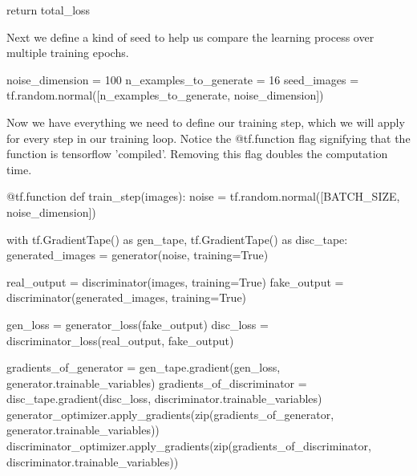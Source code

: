 \documentclass[%
oneside,                 %
final,                   %
10pt]{article}
\begin{document}
    return total_loss

\epycod


Next we define a kind of seed to help us compare the learning process over
multiple training epochs.





\bpycod
noise_dimension = 100
n_examples_to_generate = 16
seed_images = tf.random.normal([n_examples_to_generate, noise_dimension])

\epycod


Now we have everything we need to define our training step, which we will apply
for every step in our training loop. Notice the @tf.function flag signifying
that the function is tensorflow 'compiled'. Removing this flag doubles the
computation time.

























\bpycod
@tf.function
def train_step(images):
    noise = tf.random.normal([BATCH_SIZE, noise_dimension])

    with tf.GradientTape() as gen_tape, tf.GradientTape() as disc_tape:
        generated_images = generator(noise, training=True)

        real_output = discriminator(images, training=True)
        fake_output = discriminator(generated_images, training=True)

        gen_loss = generator_loss(fake_output)
        disc_loss = discriminator_loss(real_output, fake_output)

    gradients_of_generator = gen_tape.gradient(gen_loss,
                                            generator.trainable_variables)
    gradients_of_discriminator = disc_tape.gradient(disc_loss,
                                            discriminator.trainable_variables)
    generator_optimizer.apply_gradients(zip(gradients_of_generator,
                                            generator.trainable_variables))
    discriminator_optimizer.apply_gradients(zip(gradients_of_discriminator,
                                            discriminator.trainable_variables))
\end{document}
